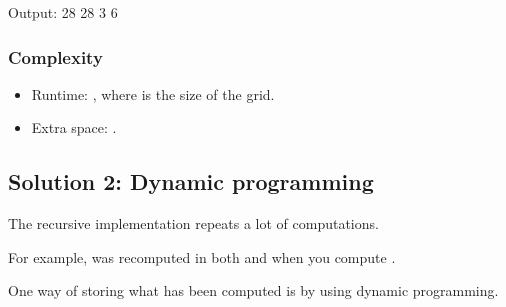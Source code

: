 \documentclass[letterpaper,12pt,english]{book}
\begin{document}
\begin{sphinxVerbatim}[commandchars=\\\{\}]
Output:
28
28
3
6
\end{sphinxVerbatim}


\subsubsection{Complexity}
\label{\detokenize{Dynamic_Programming/05_DP_62_Unique_Paths:complexity}}\begin{itemize}
\item {} 
\sphinxAtStartPar
Runtime: , where  is the size of the grid.

\item {} 
\sphinxAtStartPar
Extra space: .

\end{itemize}


\subsection{Solution 2: Dynamic programming}
\label{\detokenize{Dynamic_Programming/05_DP_62_Unique_Paths:solution-2-dynamic-programming}}
\sphinxAtStartPar
The recursive implementation repeats a lot of computations.

\sphinxAtStartPar
For example,  was recomputed in both  and  when you compute .

\sphinxAtStartPar
One way of storing what has been computed is by using dynamic programming.
\end{document}
